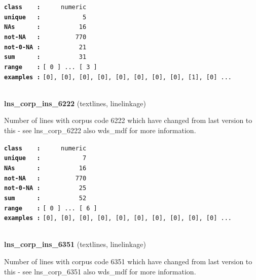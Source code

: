 \documentclass[]{article}
\begin{document}
\textbf{\texttt{class\ \ \ \ :}} \texttt{~~~~~numeric}\\
\textbf{\texttt{unique\ \ \ :}} \texttt{~~~~~~~~~~~5}\\
\textbf{\texttt{NAs\ \ \ \ \ \ :}} \texttt{~~~~~~~~~~16}\\
\textbf{\texttt{not-NA\ \ \ :}} \texttt{~~~~~~~~~770}\\
\textbf{\texttt{not-0-NA\ :}} \texttt{~~~~~~~~~~21}\\
\textbf{\texttt{sum\ \ \ \ \ \ :}} \texttt{~~~~~~~~~~31}\\
\textbf{\texttt{range\ \ \ \ :}}
\texttt{{[}\ 0\ {]}\ ...\ {[}\ 3\ {]}}\\
\textbf{\texttt{examples\ :}}
\texttt{{[}0{]},\ {[}0{]},\ {[}0{]},\ {[}0{]},\ {[}0{]},\ {[}0{]},\ {[}0{]},\ {[}0{]},\ {[}1{]},\ {[}0{]}\ ...}\\

~

\textbf{lns\_corp\_ins\_6222} (textlines, linelinkage)

Number of lines with corpus code 6222 which have changed from last
version to this - see lns\_corp\_6222 also wds\_mdf for more
information.

\textbf{\texttt{class\ \ \ \ :}} \texttt{~~~~~numeric}\\
\textbf{\texttt{unique\ \ \ :}} \texttt{~~~~~~~~~~~7}\\
\textbf{\texttt{NAs\ \ \ \ \ \ :}} \texttt{~~~~~~~~~~16}\\
\textbf{\texttt{not-NA\ \ \ :}} \texttt{~~~~~~~~~770}\\
\textbf{\texttt{not-0-NA\ :}} \texttt{~~~~~~~~~~25}\\
\textbf{\texttt{sum\ \ \ \ \ \ :}} \texttt{~~~~~~~~~~52}\\
\textbf{\texttt{range\ \ \ \ :}}
\texttt{{[}\ 0\ {]}\ ...\ {[}\ 6\ {]}}\\
\textbf{\texttt{examples\ :}}
\texttt{{[}0{]},\ {[}0{]},\ {[}0{]},\ {[}0{]},\ {[}0{]},\ {[}0{]},\ {[}0{]},\ {[}0{]},\ {[}0{]},\ {[}0{]}\ ...}\\

~

\textbf{lns\_corp\_ins\_6351} (textlines, linelinkage)

Number of lines with corpus code 6351 which have changed from last
version to this - see lns\_corp\_6351 also wds\_mdf for more
information.
\end{document}

